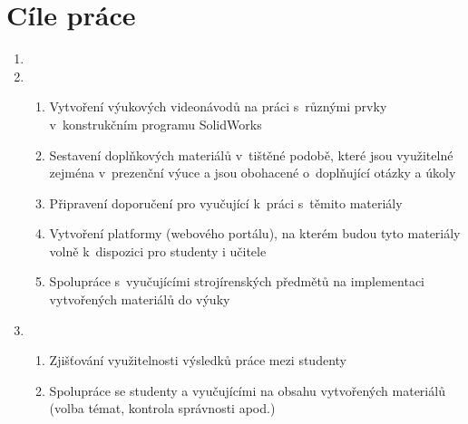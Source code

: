 \chapter{Cíle práce}

\begin{enumerate}[topsep=0pt]
    \setlength\itemsep{0em}
    \item {}
    
    \item {}
    \begin{enumerate}[topsep=0pt]
        \setlength\itemsep{0em}
        \item Vytvoření výukových videonávodů na práci s~různými prvky v~konstrukčním programu SolidWorks
        \item Sestavení doplňkových materiálů v~tištěné podobě, které jsou využitelné zejména v~prezenční výuce a jsou obohacené o~doplňující otázky a úkoly
        \item Připravení doporučení pro vyučující k~práci s~těmito materiály
        \item Vytvoření platformy (webového portálu), na kterém budou tyto materiály volně k~dispozici pro studenty i učitele
        \item Spolupráce s~vyučujícími strojírenských předmětů na implementaci vytvořených materiálů do výuky
    \end{enumerate}

    \item {}
    \begin{enumerate}[topsep=0pt]
        \setlength\itemsep{0em}
        \item Zjišťování využitelnosti výsledků práce mezi studenty 
        \item Spolupráce se studenty a vyučujícími na obsahu vytvořených materiálů (volba témat, kontrola správnosti apod.) 
    \end{enumerate}
\end{enumerate}
